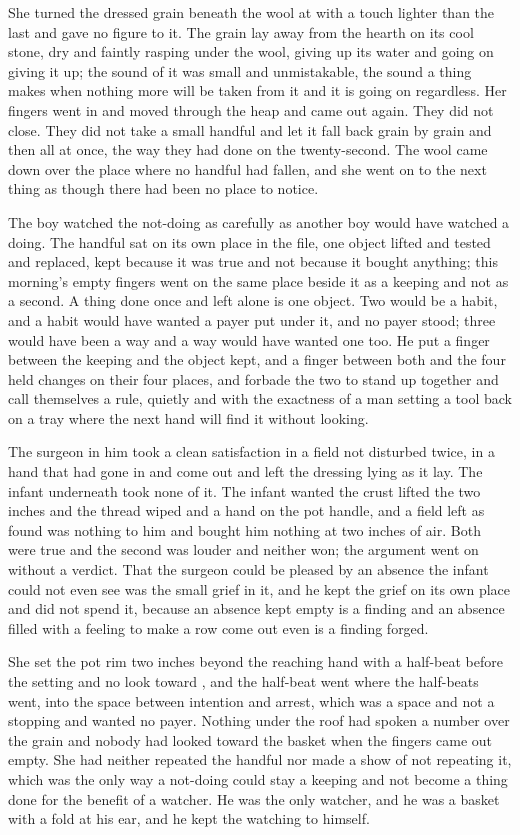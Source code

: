 \scenebreak

She turned the dressed grain beneath the wool at  with a touch lighter than the last and gave no figure to it. The grain lay away from the hearth on its cool stone, dry and faintly rasping under the wool, giving up its water and going on giving it up; the sound of it was small and unmistakable, the sound a thing makes when nothing more will be taken from it and it is going on regardless. Her fingers went in and moved through the heap and came out again. They did not close. They did not take a small handful and let it fall back grain by grain and then all at once, the way they had done on the twenty-second. The wool came down over the place where no handful had fallen, and she went on to the next thing as though there had been no place to notice.

The boy watched the not-doing as carefully as another boy would have watched a doing. The handful sat on its own place in the file, one object lifted and tested and replaced, kept because it was true and not because it bought anything; this morning's empty fingers went on the same place beside it as a keeping and not as a second. A thing done once and left alone is one object. Two would be a habit, and a habit would have wanted a payer put under it, and no payer stood; three would have been a way and a way would have wanted one too. He put a finger between the keeping and the object kept, and a finger between both and the four held changes on their four places, and forbade the two to stand up together and call themselves a rule, quietly and with the exactness of a man setting a tool back on a tray where the next hand will find it without looking.

The surgeon in him took a clean satisfaction in a field not disturbed twice, in a hand that had gone in and come out and left the dressing lying as it lay. The infant underneath took none of it. The infant wanted the crust lifted the two inches and the thread wiped and a hand on the pot handle, and a field left as found was nothing to him and bought him nothing at two inches of air. Both were true and the second was louder and neither won; the argument went on without a verdict. That the surgeon could be pleased by an absence the infant could not even see was the small grief in it, and he kept the grief on its own place and did not spend it, because an absence kept empty is a finding and an absence filled with a feeling to make a row come out even is a finding forged.

She set the pot rim two inches beyond the reaching hand with a half-beat before the setting and no look toward , and the half-beat went where the half-beats went, into the space between intention and arrest, which was a space and not a stopping and wanted no payer. Nothing under the roof had spoken a number over the grain and nobody had looked toward the basket when the fingers came out empty. She had neither repeated the handful nor made a show of not repeating it, which was the only way a not-doing could stay a keeping and not become a thing done for the benefit of a watcher. He was the only watcher, and he was a basket with a fold at his ear, and he kept the watching to himself.

